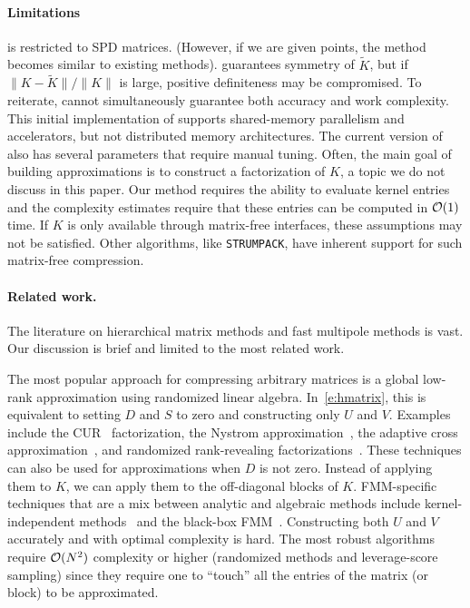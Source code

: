 \paragraph{\textbf{Limitations}}
\gofmm{} is restricted to SPD matrices. (However, if we are given points, the method becomes similar to existing methods).
\gofmm{} guarantees symmetry of $\tilde{K}$, but if $\|K-\tilde{K}\|/\|K\|$ is large, positive definiteness may be compromised. 
To reiterate, \gofmm{} cannot simultaneously guarantee both accuracy and work complexity.
This initial implementation of \gofmm{} supports shared-memory parallelism and accelerators, but not distributed memory architectures.
The current version of \gofmm{} also has several parameters that require manual tuning.
Often, the main goal of building \hmatrix{} approximations is to construct a factorization of $K$, a topic we do not discuss in this paper.  Our method requires the ability to evaluate kernel entries and the complexity estimates require that these entries can be computed in $\operatorname{\mathcal{O}}(1)$ time. If $K$ is only available through matrix-free interfaces, these assumptions may not be satisfied. Other algorithms, like \texttt{STRUMPACK}, have inherent support for such matrix-free compression.

\paragraph{\textbf{Related work.}} The literature on hierarchical matrix methods and fast multipole methods is vast. Our discussion is brief and limited to the most related work.
                              
 The most popular approach for compressing arbitrary matrices is a global low-rank approximation using randomized linear algebra. In~\eqref{e:hmatrix}, this is equivalent to setting $D$ and $S$ to zero and constructing only $U$ and $V$. Examples include the CUR~\cite{mahoney-drineas09} factorization, the Nystrom approximation~\cite{williams-seeger01}, the adaptive cross approximation~\cite{bebendorf-rjasanow03}, and randomized rank-revealing factorizations~\cite{martinsson-rokhlin-tygert10,halko-martinsson-tropp11}. These techniques can also be used for \hmatrix{} approximations when $D$ is not zero. Instead of applying them to $K$, we can apply them to the off-diagonal blocks of $K$. FMM-specific techniques that are
a mix between analytic and algebraic methods include
kernel-independent methods~\cite{martinsson-rokhlin07,ying-biros-zorin-03} and the
black-box FMM~\cite{fong-darve09}. Constructing both $U$ and $V$ accurately and with optimal complexity is hard. The most robust algorithms require $\operatorname{\mathcal{O}}(N^2)$ complexity or higher (randomized methods and leverage-score sampling) since they require one to ``touch'' all the entries of the matrix (or block) to be approximated.

